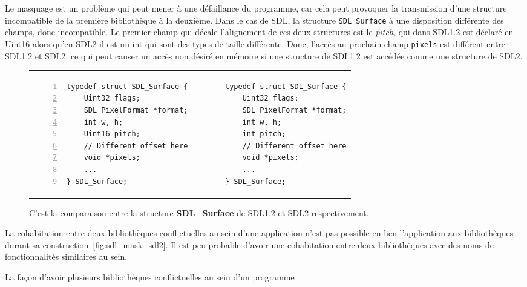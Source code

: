 Le masquage est un problème qui peut mener à une défaillance du
programme, car cela peut provoquer la transmission d'une structure incompatible
de la première bibliothèque à la deuxième. Dans le cas de SDL, la structure
\verb+SDL_Surface+ à une disposition différente des champs, donc incompatible.
Le premier champ qui décale l'alignement de ces deux structures est le
\textit{pitch}, qui dans SDL1.2 est déclaré en Uint16 alors qu'en SDL2 il est
un int qui sont des types de taille différente. Donc, l'accès au prochain champ
\texttt{pixels} est différent entre SDL1.2 et SDL2, ce qui peut causer un accès
non désiré en mémoire si une structure de SDL1.2 est accédée comme une structure
de SDL2.


\begin{figure}[h]
  \centering
\begin{tabular}{p{18em}p{18em}}
\begin{lstlisting}[frame=single,numbers=left]
typedef struct SDL_Surface {
    Uint32 flags;
    SDL_PixelFormat *format;
    int w, h;
    Uint16 pitch;
    // Different offset here
    void *pixels;
    ...
} SDL_Surface;
\end{lstlisting}&
\begin{lstlisting}[frame=single,numbers=right]
typedef struct SDL_Surface {
    Uint32 flags;
    SDL_PixelFormat *format;
    int w, h;
    int pitch;
    // Different offset here
    void *pixels;
    ...
} SDL_Surface;
\end{lstlisting}\\
\end{tabular}
  \caption{C'est la comparaison entre la structure \textbf{SDL\_Surface} de SDL1.2 et SDL2 respectivement.}
  \label{fig:sdl_surface}
\end{figure}


La cohabitation entre deux bibliothèques conflictuelles au sein d'une application n'est pas possible
en lien l'application aux bibliothèques durant sa construction~\ref{fig:sdl_mask_sdl2}.
Il est peu probable d'avoir une cohabitation entre deux bibliothèques avec des noms de fonctionnalités
similaires au sein.

La façon d'avoir plusieurs bibliothèques conflictuelles au sein d'un programme 


